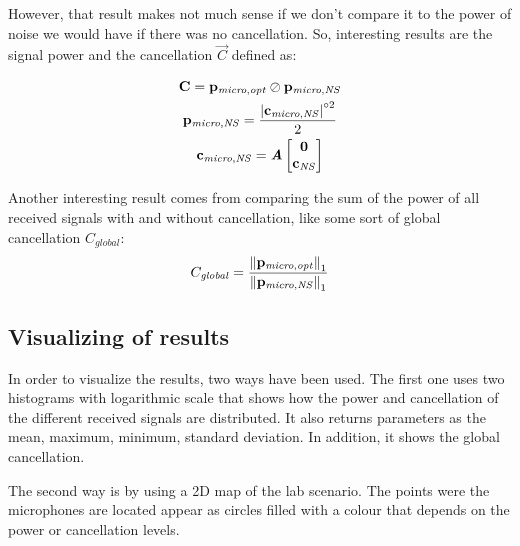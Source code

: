 However, that result makes not much sense if we don't compare it to the power of noise we would have if there was no cancellation. So, interesting results are the signal power and the cancellation $\vec{C}$ defined as:

\begin{gather}
\mathbf{C} = \mathbf{p_\mathit{micro,opt}} \oslash \mathbf{p_\mathit{micro,NS}} \\
\mathbf{p_\mathit{micro,NS}} = \frac{\left| \mathbf{c_{\mathit{micro,NS}}} \right|^{\circ 2}}{2}\\
\mathbf{c_{\mathit{micro,NS}}} = \bm{\mathit{A}} 
\begin{bmatrix}
	\mathbf{0} \\
	\mathbf{c_{\mathit{NS}}}
\end{bmatrix}
\end{gather}

Another interesting result comes from comparing the sum of the power of all received signals with and without cancellation, like some sort of global cancellation $C_\mathit{global}$:
\begin{equation}
C_\mathit{global} = \frac{\left\| \mathbf{p_\mathit{micro,opt}} \right\|_1}{\left\| \mathbf{p_\mathit{micro,NS}} \right\|_1}
\end{equation}

\subsection{Visualizing of results}
In order to visualize the results, two ways have been used. The first one uses two histograms with logarithmic scale that shows how the power and cancellation of the different received signals are distributed. It also returns parameters as the mean, maximum, minimum, standard deviation. In addition, it shows the global cancellation.

The second way is by using a 2D map of the lab scenario. The points were the microphones are located appear as circles filled with a colour that depends on the power or cancellation levels.

